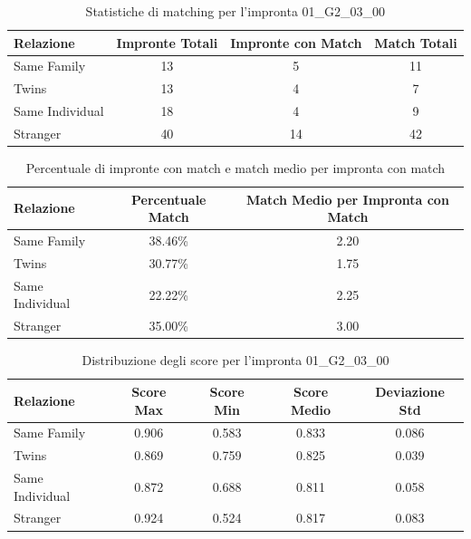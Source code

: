 \begin{table}[htbp]
\centering
\caption{Statistiche di matching per l'impronta 01\_G2\_03\_00}
\label{tab:results_01_G2_03_00}
\begin{tabular}{|l|c|c|c|}
\hline
\textbf{Relazione} & \textbf{Impronte Totali} & \textbf{Impronte con Match} & \textbf{Match Totali} \\
\hline
Same Family & 13 & 5 & 11 \\
\hline
Twins & 13 & 4 & 7 \\
\hline
Same Individual & 18 & 4 & 9 \\
\hline
Stranger & 40 & 14 & 42 \\
\hline
\end{tabular}
\end{table}


\begin{table}[htbp]
\centering
\caption{Percentuale di impronte con match e match medio per impronta con match}
\label{tab:match_percentage_01_G2_03_00}
\begin{tabular}{|l|c|c|}
\hline
\textbf{Relazione} & \textbf{Percentuale Match} & \textbf{Match Medio per Impronta con Match} \\
\hline
Same Family & 38.46\% & 2.20 \\
\hline
Twins & 30.77\% & 1.75 \\
\hline
Same Individual & 22.22\% & 2.25 \\
\hline
Stranger & 35.00\% & 3.00 \\
\hline
\end{tabular}
\end{table}


\begin{table}[htbp]
\centering
\caption{Distribuzione degli score per l'impronta 01\_G2\_03\_00}
\label{tab:scores_01_G2_03_00}
\begin{tabular}{|l|c|c|c|c|}
\hline
\textbf{Relazione} & \textbf{Score Max} & \textbf{Score Min} & \textbf{Score Medio} & \textbf{Deviazione Std} \\
\hline
Same Family & 0.906 & 0.583 & 0.833 & 0.086 \\
\hline
Twins & 0.869 & 0.759 & 0.825 & 0.039 \\
\hline
Same Individual & 0.872 & 0.688 & 0.811 & 0.058 \\
\hline
Stranger & 0.924 & 0.524 & 0.817 & 0.083 \\
\hline
\end{tabular}
\end{table}

